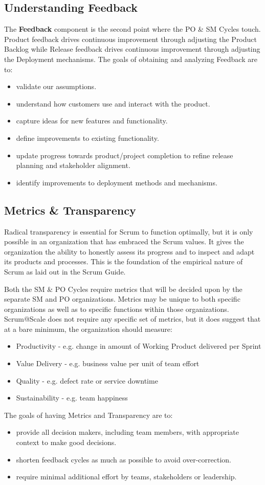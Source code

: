 \documentclass[12pt,a4paper,parskip=full]{scrartcl}
\begin{document}
\subsection{Understanding Feedback}
The \textbf{Feedback} component is the second point where the PO \& SM
Cycles touch. Product feedback drives continuous improvement through
adjusting the Product Backlog while Release feedback drives continuous
improvement through adjusting the Deployment mechanisms. The goals of
obtaining and analyzing Feedback are to:
\begin{itemize}
\item validate our assumptions.
\item understand how customers use and interact with the product.
\item capture ideas for new features and functionality.
\item define improvements to existing functionality.
\item update progress towards product/project completion to refine release
planning and stakeholder alignment.
\item identify improvements to deployment methods and mechanisms.
\end{itemize}

\subsection{Metrics \& Transparency}
Radical transparency is essential for Scrum to function optimally, but it
is only possible in an organization that has embraced the Scrum values. It
gives the organization the ability to honestly assess its progress and to
inspect and adapt its products and processes. This is the foundation of the
empirical nature of Scrum as laid out in the Scrum Guide.

Both the SM \& PO Cycles require metrics that will be decided upon by the
separate SM and PO organizations. Metrics may be unique to both specific
organizations as well as to specific functions within those organizations.
Scrum@Scale does not require any specific set of metrics, but it does
suggest that at a bare minimum, the organization should measure:
\begin{itemize}
\item Productivity - e.g. change in amount of Working Product delivered per
Sprint
\item Value Delivery - e.g. business value per unit of team effort
\item Quality - e.g. defect rate or service downtime
\item Sustainability - e.g. team happiness
\end{itemize}
The goals of having Metrics and Transparency are to:
\begin{itemize}
  \item provide all decision makers, including team members, with
appropriate context to make good decisions.
\item shorten feedback cycles as much as possible to avoid over-correction.
\item require minimal additional effort by teams, stakeholders or
leadership.
 \end{itemize}
\end{document}
